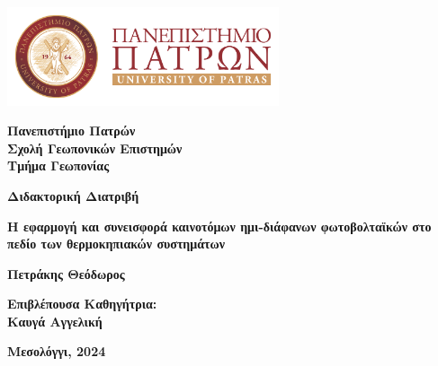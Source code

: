 \documentclass[12pt, a4paper]{report} %
\begin{document}
\begin{titlepage}
    \centering
{}
    
    \includegraphics[width=0.6\textwidth]{Figures/University_of_Patras.png}

    \vspace{0.5cm}
    
    {\Large \textbf{Πανεπιστήμιο Πατρών}\\}
    \vspace{0.1cm}
    {\Large \textbf{Σχολή Γεωπονικών Επιστημών}\\}
    \vspace{0.1cm}
    {\Large \textbf{Τμήμα Γεωπονίας}\\}

    \vfill
    {\LARGE \textbf{Διδακτορική Διατριβή}\\}

    \vfill
    {\Huge \textbf{Η εφαρμογή και συνεισφορά καινοτόμων ημι-διάφανων φωτοβολταϊκών στο πεδίο των θερμοκηπιακών συστημάτων}}

    \vfill  
    {\LARGE \textbf{Πετράκης Θεόδωρος}\\}

    \vfill
    {\Large \textbf{Επιβλέπουσα Καθηγήτρια:}\\}
    {\Large \textbf{Καυγά Αγγελική}\\}

    \vfill

    {\Large \textbf{Μεσολόγγι, 2024}\\}
    
\end{titlepage}

\newpage
\thispagestyle{empty}
\mbox{}
\newpage
\end{document}
